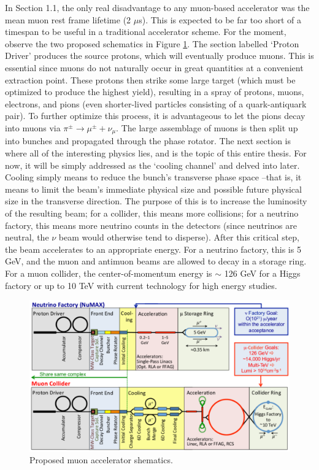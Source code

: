 In Section 1.1, the only real disadvantage to any muon-based accelerator was the mean muon rest frame lifetime (2 $\mu$s). This is expected to be far too short of a timespan to be useful in a traditional accelerator scheme. For the moment, observe the two proposed schematics in Figure \ref{fig:muon_accelerator_schematic}. The section labelled `Proton Driver' produces the source protons, which will eventually produce muons. This is essential since muons do not naturally occur in great quantities at a convenient extraction point. These protons then strike some large target (which must be optimized to produce the highest yield), resulting in a spray of protons, muons, electrons, and pions (even shorter-lived particles consisting of a quark-antiquark pair). To further optimize this process, it is advantageous to let the pions decay into muons via $\pi^\pm \rightarrow \mu^\pm + \nu_\mu$. The large assemblage of muons is then split up into bunches and propagated through the phase rotator. The next section is where all of the interesting physics lies, and is the topic of this entire thesis. For now, it will be simply addressed as the `cooling channel' and delved into later. Cooling simply means to reduce the bunch's transverse phase space --that is, it means to limit the beam's immediate physical size and possible future physical size in the transverse direction. The purpose of this is to increase the luminosity of the resulting beam; for a collider, this means more collisions; for a neutrino factory, this means more neutrino counts in the detectors (since neutrinos are neutral, the $\nu$ beam would otherwise tend to disperse). After this critical step, the beam accelerates to an appropriate energy. For a neutrino factory, this is 5 GeV, and the muon and antimuon beams are allowed to decay in a storage ring. For a muon collider, the center-of-momentum energy is $\sim$ 126 GeV for a Higgs factory or up to 10 TeV with current technology for high energy studies.

\begin{figure}
  \centering
    \includegraphics[width=\textwidth]{Figures/muon_accelerator_schematic} 
  \caption{Proposed muon accelerator shematics.}
  \label{fig:muon_accelerator_schematic}
\end{figure}


